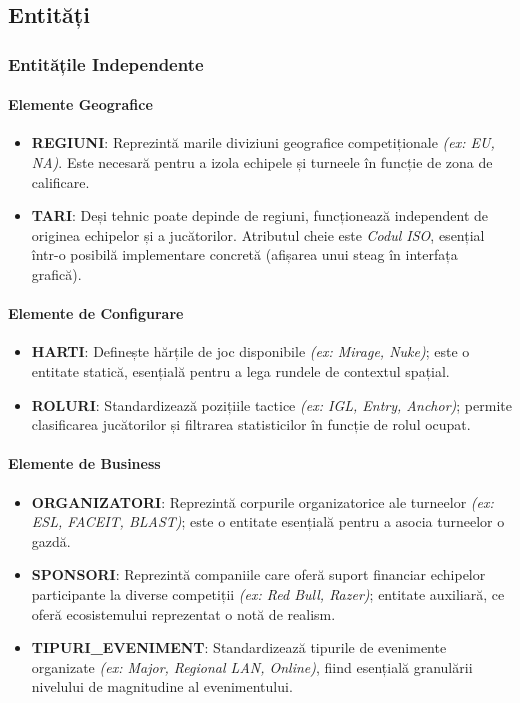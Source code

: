 \documentclass[11pt, a4paper]{article}
\begin{document}
\subsection{Entități}

\subsubsection{Entitățile Independente}

\paragraph{Elemente Geografice}
\begin{itemize}
    \item \textbf{REGIUNI}: Reprezintă marile diviziuni geografice competiționale \textit{(ex: EU, NA)}. Este necesară pentru a izola echipele și turneele în funcție de zona de calificare.
    \item \textbf{TARI}: Deși tehnic poate depinde de regiuni, funcționează independent de originea echipelor și a jucătorilor. Atributul cheie este \textit{Codul ISO}, esențial într-o posibilă implementare concretă (afișarea unui steag în interfața grafică).
\end{itemize}

\paragraph{Elemente de Configurare}
\begin{itemize}
    \item \textbf{HARTI}: Definește hărțile de joc disponibile \textit{(ex: Mirage, Nuke)}; este o entitate statică, esențială pentru a lega rundele de contextul spațial.
    \item \textbf{ROLURI}: Standardizează pozițiile tactice \textit{(ex: IGL, Entry, Anchor)}; permite clasificarea jucătorilor și filtrarea statisticilor în funcție de rolul ocupat.
\end{itemize}

\paragraph{Elemente de Business}
\begin{itemize}
    \item \textbf{ORGANIZATORI}: Reprezintă corpurile organizatorice ale turneelor \textit{(ex: ESL, FACEIT, BLAST)}; este o entitate esențială pentru a asocia turneelor o gazdă.
    \item \textbf{SPONSORI}: Reprezintă companiile care oferă suport financiar echipelor participante la diverse competiții \textit{(ex: Red Bull, Razer)}; entitate auxiliară, ce oferă ecosistemului reprezentat o notă de realism.
    \item \textbf{TIPURI\_EVENIMENT}: Standardizează tipurile de evenimente organizate \textit{(ex: Major, Regional LAN, Online)}, fiind esențială granulării nivelului de magnitudine al evenimentului.
\end{itemize}
\end{document}
